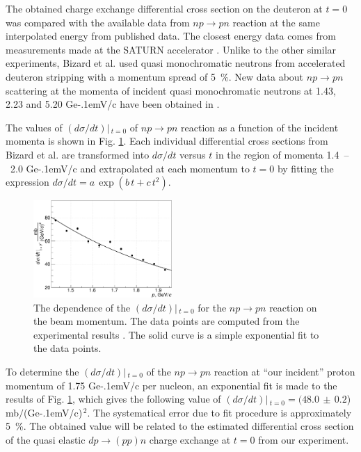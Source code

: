 \documentclass[twocolumn,epjc3]{svjour3}
\newcommand{\np}     {\ensuremath{np \rightarrow pn}\xspace}
\newcommand{\dpchex} {\ensuremath{dp \rightarrow (pp)n}\xspace}
\newcommand{\GeVc}   {Ge\kern-.1emV/c\xspace}
\begin{document}
The obtained charge exchange differential cross section on the deuteron at $t=0$
was compared with the available data from \np reaction at the same interpolated
energy from published data. The closest energy data comes from measurements made
at the SATURN accelerator \cite{biz75,bys78}. Unlike to the other similar
experiments, Bizard et al. \cite{biz75} used quasi monochromatic neutrons from
accelerated deuteron stripping with a momentum spread of 5~\%. New data about
\np scattering at the momenta of incident quasi monochromatic neutrons at 1.43,
2.23 and 5.20 \GeVc have been obtained in \cite{tro14}.

The values of $(d\sigma/dt)|\,_{t=0}$ of \np reaction as a function of the
incident momenta is shown in Fig. \ref{fig:npsigma}. Each individual
differential cross sections from Bizard et al. \cite{biz75} are transformed into
$d\sigma/dt$ versus $t$ in the region of momenta 1.4~--~2.0 \GeVc and
extrapolated at each momentum to $t=0$ by fitting the expression
$d\sigma/dt = a\,\exp(b\,t + c\,t^2)$.

\begin{figure}[ht]
  \centering
  \includegraphics[width=0.47\textwidth]{np_dSigma.pdf}
  \caption{The dependence of the $(d\sigma/dt)|\,_{t=0}$ for the \np reaction on
    the beam momentum. The data points are computed from the experimental
    results \cite{biz75}. The solid curve is a simple exponential fit to the
    data points.}
  \label{fig:npsigma}
\end{figure}

To determine the $(d\sigma/dt)|\,_{t=0}$ of the \np reaction at ``our incident''
proton momentum of 1.75 \GeVc per nucleon, an exponential fit is made to the
results of Fig. \ref{fig:npsigma}, which gives the following value of
$(d\sigma/dt)|\,_{t=0} = (48.0\,\pm\,0.2$) mb$/$(\GeVc)$^{\,2}$. The
systematical error due to fit procedure is approximately 5~\%. The obtained
value will be related to the estimated differential cross section of the quasi
elastic \dpchex charge exchange at $t=0$ from our experiment.
\end{document}
